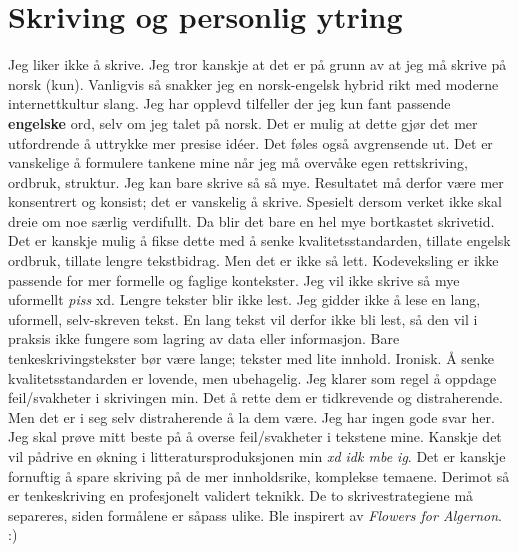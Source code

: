 \documentclass{article}
\numberwithin{equation}{section}
\begin{document}
\section{Skriving og personlig ytring}
Jeg liker ikke å skrive. Jeg tror kanskje at det er på grunn av at jeg må skrive på norsk (kun). Vanligvis så snakker jeg en norsk-engelsk hybrid rikt med moderne internettkultur slang. Jeg har opplevd tilfeller der jeg kun fant passende \textbf{engelske} ord, selv om jeg talet på norsk. Det er mulig at dette gjør det mer utfordrende å uttrykke mer presise idéer. \newline
Det føles også avgrensende ut. Det er vanskelige å formulere tankene mine når jeg må overvåke egen rettskriving, ordbruk, struktur. Jeg kan bare skrive så så mye. Resultatet må derfor være mer konsentrert og konsist; det er vanskelig å skrive. Spesielt dersom verket ikke skal dreie om noe særlig verdifullt. Da blir det bare en hel mye bortkastet skrivetid. \newline
Det er kanskje mulig å fikse dette med å senke kvalitetsstandarden, tillate engelsk ordbruk, tillate lengre tekstbidrag. Men det er ikke så lett. Kodeveksling er ikke passende for mer formelle og faglige kontekster. Jeg vil ikke skrive så mye uformellt \textit{piss} xd. Lengre tekster blir ikke lest. Jeg gidder ikke å lese en lang, uformell, selv-skreven tekst. En lang tekst vil derfor ikke bli lest, så den vil i praksis ikke fungere som lagring av data eller informasjon. Bare tenkeskrivingstekster bør være lange; tekster med lite innhold. Ironisk. Å senke kvalitetsstandarden er lovende, men ubehagelig. Jeg klarer som regel å oppdage feil/svakheter i skrivingen min. Det å rette dem er tidkrevende og distraherende. Men det er i seg selv distraherende å la dem være.\newline
Jeg har ingen gode svar her. Jeg skal prøve mitt beste på å overse feil/svakheter i tekstene mine. Kanskje det vil pådrive en økning i litteratursproduksjonen min \textit{xd idk mbe ig}. Det er kanskje fornuftig å spare skriving på de mer innholdsrike, komplekse temaene. Derimot så er tenkeskriving en profesjonelt validert teknikk. De to skrivestrategiene må separeres, siden formålene er såpass ulike. \newline
\tiny{Ble inspirert av \textit{Flowers for Algernon}. :)}
\small
\end{document}
